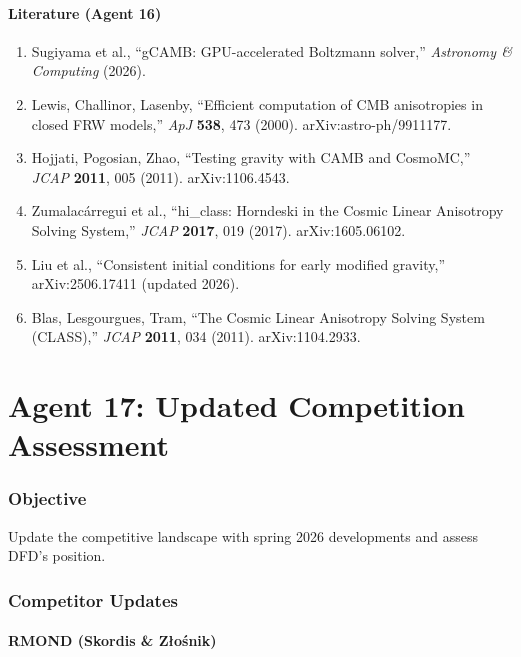 \documentclass[11pt,a4paper]{article}
\begin{document}
\subsection{Literature (Agent 16)}

\begin{enumerate}
\item Sugiyama et al., ``gCAMB: GPU-accelerated Boltzmann solver,'' \textit{Astronomy \& Computing} (2026).
\item Lewis, Challinor, Lasenby, ``Efficient computation of CMB anisotropies in closed FRW models,'' \textit{ApJ} \textbf{538}, 473 (2000). arXiv:astro-ph/9911177.
\item Hojjati, Pogosian, Zhao, ``Testing gravity with CAMB and CosmoMC,'' \textit{JCAP} \textbf{2011}, 005 (2011). arXiv:1106.4543.
\item Zumalac\'arregui et al., ``hi\_class: Horndeski in the Cosmic Linear Anisotropy Solving System,'' \textit{JCAP} \textbf{2017}, 019 (2017). arXiv:1605.06102.
\item Liu et al., ``Consistent initial conditions for early modified gravity,'' arXiv:2506.17411 (updated 2026).
\item Blas, Lesgourgues, Tram, ``The Cosmic Linear Anisotropy Solving System (CLASS),'' \textit{JCAP} \textbf{2011}, 034 (2011). arXiv:1104.2933.
\end{enumerate}


\part{Agent 17: Updated Competition Assessment}
\label{part:competition-update}

\section{Objective}

Update the competitive landscape with spring 2026 developments and assess DFD's position.

\section{Competitor Updates}

\subsection{RMOND (Skordis \& Z{\l}o\'snik)}
\end{document}
